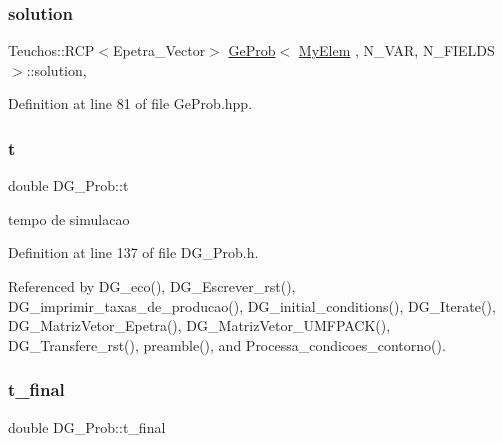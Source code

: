 \mbox{\label{classGeProb_af084ddda2d2d48a332141881d7b22a7d}} 
\subsubsection{\texorpdfstring{solution}{solution}}
{\footnotesize\ttfamily Teuchos\+::\+R\+CP$<$Epetra\+\_\+\+Vector$>$ \hyperlink{classGeProb}{Ge\+Prob}$<$ \hyperlink{DG__Prob_8h_a83cd887ced9a6587428f267e50cd4787}{My\+Elem} , N\+\_\+\+V\+AR, N\+\_\+\+F\+I\+E\+L\+DS $>$\+::solution\hspace{0.3cm}{\ttfamily [protected]}, {\ttfamily [inherited]}}



Definition at line 81 of file Ge\+Prob.\+hpp.

\mbox{\label{classDG__Prob_a5106aac0b8fa9508c2a40c2f177c9b02}} 
\subsubsection{\texorpdfstring{t}{t}}
{\footnotesize\ttfamily double D\+G\+\_\+\+Prob\+::t\hspace{0.3cm}{\ttfamily [private]}}



tempo de simulacao 



Definition at line 137 of file D\+G\+\_\+\+Prob.\+h.



Referenced by D\+G\+\_\+eco(), D\+G\+\_\+\+Escrever\+\_\+rst(), D\+G\+\_\+imprimir\+\_\+taxas\+\_\+de\+\_\+producao(), D\+G\+\_\+initial\+\_\+conditions(), D\+G\+\_\+\+Iterate(), D\+G\+\_\+\+Matriz\+Vetor\+\_\+\+Epetra(), D\+G\+\_\+\+Matriz\+Vetor\+\_\+\+U\+M\+F\+P\+A\+C\+K(), D\+G\+\_\+\+Transfere\+\_\+rst(), preamble(), and Processa\+\_\+condicoes\+\_\+contorno().

\mbox{\label{classDG__Prob_a932346b7bdab75852dffa347eceb95b6}} 
\subsubsection{\texorpdfstring{t\+\_\+final}{t\_final}}
{\footnotesize\ttfamily double D\+G\+\_\+\+Prob\+::t\+\_\+final\hspace{0.3cm}{\ttfamily [private]}}



